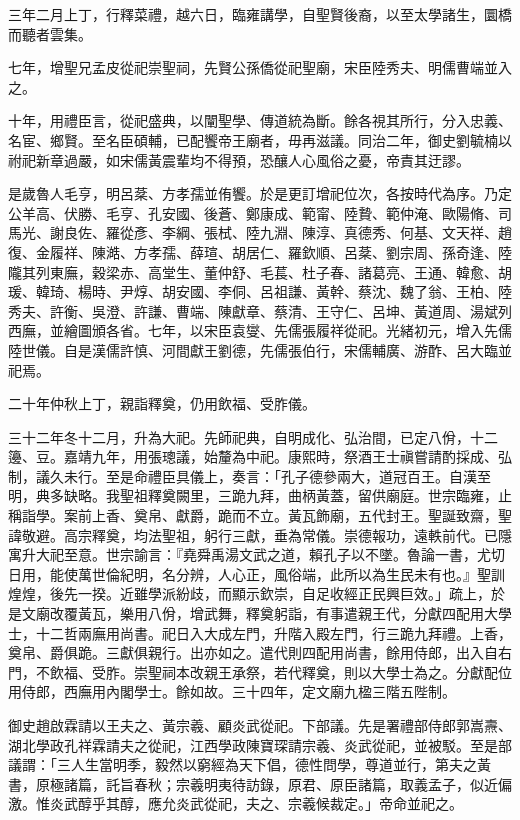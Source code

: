 \begin{pinyinscope}
三年二月上丁，行釋菜禮，越六日，臨雍講學，自聖賢後裔，以至太學諸生，圜橋而聽者雲集。

七年，增聖兄孟皮從祀崇聖祠，先賢公孫僑從祀聖廟，宋臣陸秀夫、明儒曹端並入之。

十年，用禮臣言，從祀盛典，以闡聖學、傳道統為斷。餘各視其所行，分入忠義、名宦、鄉賢。至名臣碩輔，已配饗帝王廟者，毋再滋議。同治二年，御史劉毓楠以祔祀新章過嚴，如宋儒黃震輩均不得預，恐釀人心風俗之憂，帝責其迂謬。

是歲魯人毛亨，明呂棻、方孝孺並侑饗。於是更訂增祀位次，各按時代為序。乃定公羊高、伏勝、毛亨、孔安國、後蒼、鄭康成、範甯、陸贄、範仲淹、歐陽脩、司馬光、謝良佐、羅從彥、李綱、張栻、陸九淵、陳淳、真德秀、何基、文天祥、趙復、金履祥、陳澔、方孝孺、薛瑄、胡居仁、羅欽順、呂棻、劉宗周、孫奇逢、陸隴其列東廡，穀梁赤、高堂生、董仲舒、毛萇、杜子春、諸葛亮、王通、韓愈、胡瑗、韓琦、楊時、尹焞、胡安國、李侗、呂祖謙、黃幹、蔡沈、魏了翁、王柏、陸秀夫、許衡、吳澄、許謙、曹端、陳獻章、蔡清、王守仁、呂坤、黃道周、湯斌列西廡，並繪圖頒各省。七年，以宋臣袁燮、先儒張履祥從祀。光緒初元，增入先儒陸世儀。自是漢儒許慎、河間獻王劉德，先儒張伯行，宋儒輔廣、游酢、呂大臨並祀焉。

二十年仲秋上丁，親詣釋奠，仍用飲福、受胙儀。

三十二年冬十二月，升為大祀。先師祀典，自明成化、弘治間，已定八佾，十二籩、豆。嘉靖九年，用張璁議，始釐為中祀。康熙時，祭酒王士禛嘗請酌採成、弘制，議久未行。至是命禮臣具儀上，奏言：「孔子德參兩大，道冠百王。自漢至明，典多缺略。我聖祖釋奠闕里，三跪九拜，曲柄黃蓋，留供廟庭。世宗臨雍，止稱詣學。案前上香、奠帛、獻爵，跪而不立。黃瓦飾廟，五代封王。聖誕致齋，聖諱敬避。高宗釋奠，均法聖祖，躬行三獻，垂為常儀。崇德報功，遠軼前代。已隱寓升大祀至意。世宗諭言：『堯舜禹湯文武之道，賴孔子以不墜。魯論一書，尤切日用，能使萬世倫紀明，名分辨，人心正，風俗端，此所以為生民未有也。』聖訓煌煌，後先一揆。近雖學派紛歧，而顯示欽崇，自足收經正民興巨效。」疏上，於是文廟改覆黃瓦，樂用八佾，增武舞，釋奠躬詣，有事遣親王代，分獻四配用大學士，十二哲兩廡用尚書。祀日入大成左門，升階入殿左門，行三跪九拜禮。上香，奠帛、爵俱跪。三獻俱親行。出亦如之。遣代則四配用尚書，餘用侍郎，出入自右門，不飲福、受胙。崇聖祠本改親王承祭，若代釋奠，則以大學士為之。分獻配位用侍郎，西廡用內閣學士。餘如故。三十四年，定文廟九楹三階五陛制。

御史趙啟霖請以王夫之、黃宗羲、顧炎武從祀。下部議。先是署禮部侍郎郭嵩燾、湖北學政孔祥霖請夫之從祀，江西學政陳寶琛請宗羲、炎武從祀，並被駁。至是部議謂：「三人生當明季，毅然以窮經為天下倡，德性問學，尊道並行，第夫之黃書，原極諸篇，託旨春秋；宗羲明夷待訪錄，原君、原臣諸篇，取義孟子，似近偏激。惟炎武醇乎其醇，應允炎武從祀，夫之、宗羲候裁定。」帝命並祀之。


\end{pinyinscope}
